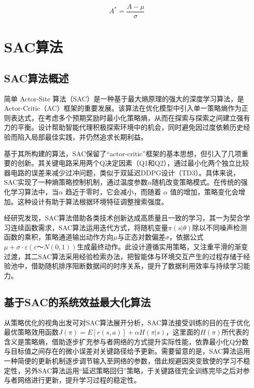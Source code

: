 \begin{equation}
	A^* = \frac{A - \mu}{\sigma}
\end{equation}

\section{SAC算法}

\subsection{SAC算法概述}
简单 Actor-Site 算法（SAC）\cite{zhou2022computation}是一种基于最大熵原理的强大的深度学习算法，是 Actor-Critic（AC）框架的重要发展。该算法在优化模型中引入单一策略熵作为正则表达式，在考虑多个预期奖励时最小化策略熵，从而在探索与探索之间建立强有力的平衡。设计帮助智能代理积极探索环境中的机会，同时避免因过度依赖历史经验而陷入局部最佳实践，并仍然追求长期利益。

基于其所构建的算法，SAC保留了“actor-critic”框架的基本思想，但引入了几项重要的创新。其关键电路采用两个Q决定因素（Q1和Q2），通过最小化两个独立比较器电路的误差来减少过冲问题，类似于双延迟DDPG设计（TD3）。具体来说，SAC实现了一种熵策略控制机制，通过温度参数\(α\)随机改变策略模式。在传统的强化学习算法中，当\( α\) 趋近于零时，它会减小，而随着 \(α\) 值的增加，策略变化会增加。这种设计有助于算法根据环境特征调整搜索强度。


经研究发现，SAC算法借助各类技术创新达成高质量且一致的学习，其一为契合学习连续函数需求，SAC算法运用迭代方式，将随机变量\(π(s|θ)\)除以不同噪声检测函数的乘积，策略通道输出动作方向\(μ\)与正态对数偏差\(σ\)，依据公式\(μ+σ·ε(ε～N(0,1))\)生成最终动作。此设计遵循实用策略，又注重平滑的渐变过渡，其二SAC算法采用经验检索办法，把智能体与环境交互产生的过程存储于经验池中，借助随机排序阻断数据间的时序关系，提升了数据利用效率与持续学习能力。

\subsection{基于SAC的系统效益最大化算法}

从策略优化的视角出发可对SAC算法展开分析，SAC算法接受训练的目的在于优化最优策略效用函数\(J(π) = E[r(s,a)] + αH(π|s)\)，这里面的\(H(π)\)所代表的含义是策略熵，借助逐步扩充参与者网络的方式提升实际性能，依靠最小化Q分数与目标值之间存在的微小误差对关键路径给予更新。需要留意的是，SAC算法运用一种简便的更新机制逐步调节输入至网络的参数，借此规避因突变致使的学习不稳定性，另外SAC算法运用“延迟策略回归”策略，于关键路径完全训练完毕之后对参与者网络进行更新，提升学习过程的稳定性。


